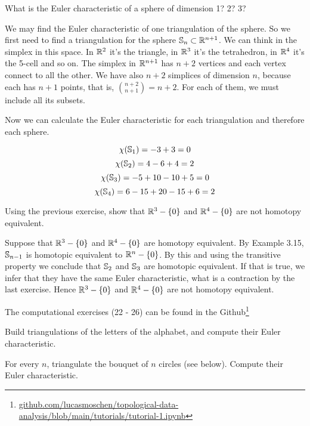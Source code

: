 \noindent\linia

\begin{exercise}
    What is the Euler characteristic of a sphere of dimension 1? 2? 3? 
\end{exercise}

We may find the Euler characteristic of one triangulation of the sphere. So we
first need to find a triangulation for the sphere $\mathbb{S}_n \subset
\mathbb{R}^{n+1}$. We can think in the simplex in this space. In $\mathbb{R}^2$ it's the
triangle, in  $\mathbb{R}^3$ it's the tetrahedron, in $\mathbb{R}^4$ it's the 5-cell and so
on. The simplex in $\mathbb{R}^{n+1}$ has $n + 2$ vertices and each vertex connect to
all the other. We have also $n+2$ simplices of dimension $n$, because each
has $n+1$ points, that is, $\genfrac(){0pt}{}{n+2}{n+1} = n+2$. For each of them, we
must include all its subsets. 

Now we can calculate the Euler characteristic for each triangulation and
therefore each sphere. 

$$
\chi(\mathbb{S}_1) = -3 + 3 = 0 
$$
$$
\chi(\mathbb{S}_2) = 4 - 6 + 4 = 2 
$$
$$
\chi(\mathbb{S}_3) = -5 + 10 - 10 + 5 = 0  
$$
$$
\chi(\mathbb{S}_4) = 6 - 15 + 20 - 15 + 6 = 2  
$$

\noindent\linia

\begin{exercise}
    Using the previous exercise, show that $\mathbb{R}^3 - \{0\}$ and $\mathbb{R}^4 - \{0\}$ are not homotopy equivalent.
\end{exercise}

Suppose that $\mathbb{R}^3 - \{0\}$ and $\mathbb{R}^4 - \{0\}$ are homotopy equivalent. By
Example 3.15, $\mathbb{S}_{n-1}$ is homotopic equivalent to $\mathbb{R}^n - \{0\}$. By
this and using the transitive property we conclude that $\mathbb{S}_2$ and
$\mathbb{S}_3$ are homotopic equivalent. If that is true, we infer that they have
the same Euler characteristic, what is a contraction by the last exercise.
Hence $\mathbb{R}^3 - \{0\}$ and $\mathbb{R}^4 - \{0\}$ are not homotopy equivalent.

\noindent\linia

The computational exercises (22 - 26) can be found in the
Github\footnote{\url{github.com/lucasmoschen/topological-data-analysis/blob/main/tutorials/tutorial-1.ipynb}}

\begin{exercise}
    Build triangulations of the letters of the alphabet, and compute their Euler characteristic.
\end{exercise}

\begin{exercise}
    For every $n$, triangulate the bouquet of $n$ circles (see below). Compute
    their Euler characteristic.
\end{exercise}


